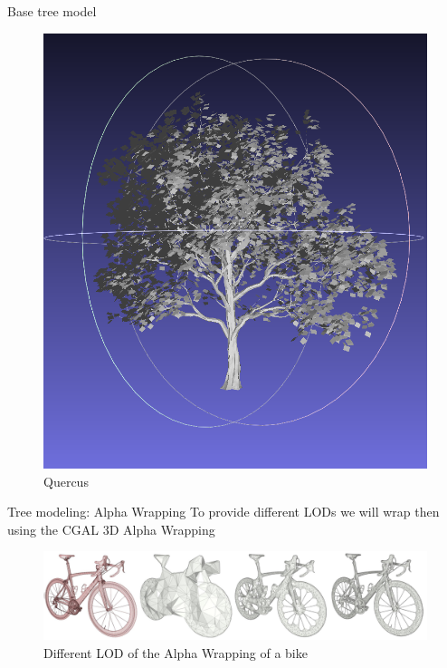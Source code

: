 \documentclass[12pt]{beamer}
\begin{document}
\begin{frame}{Base tree model}
\begin{figure}[H]
\begin{minipage}{0.24\textwidth}
        \includegraphics[width=\textwidth]{images/quercus.png}
        \caption{Quercus}
    \end{minipage}
\end{figure}
\end{frame}

\begin{frame}{Tree modeling: Alpha Wrapping}
  To provide different LODs we will wrap then using the CGAL 3D 
  Alpha Wrapping
  \begin{figure}[H]
    \centering
        \centering
        \includegraphics[width=\textwidth]{images/aw3_bike_lod.jpg}
        \caption{Different LOD of the Alpha Wrapping of a bike}
\end{figure}
\end{frame}
\end{document}

